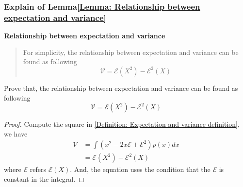 \documentclass[../concepts.tex]{subfiles}
\begin{document}
\subsubsection{Explain of Lemma\ref{Lemma: Relationship between expectation and variance}}
\textbf{Relationship between expectation and variance}
\begin{quote}
    For simplicity, the relationship between expectation and variance can be found as following
    \begin{equation*}
        \mathcal{V} = \mathcal{E}(X^2) - \mathcal{E}^2(X)
    \end{equation*}
\end{quote}

Prove that, the relationship between expectation and variance can be found as following
\begin{equation*}
    \mathcal{V} = \mathcal{E}(X^2) - \mathcal{E}^2(X)
\end{equation*}

\begin{proof}
    Compute the square in \eqref{Definition: Expectation and variance definition},
    we have
    \begin{align*}
        \mathcal{V} & = \int (x^2 - 2 x \mathcal{E} + \mathcal{E}^2) p(x) dx \\
                    & = \mathcal{E}(X^2) - \mathcal{E}^2(X)
    \end{align*}
    where $\mathcal{E}$ refers $\mathcal{E}(X)$.
    And, the equation uses the condition that the $\mathcal{E}$ is constant in the integral.
\end{proof}

\end{document}
